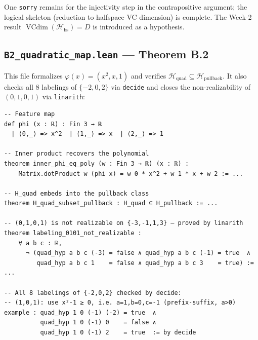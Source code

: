 \documentclass{article}
\begin{document}
One \texttt{sorry} remains for the injectivity step in the contrapositive
argument; the logical skeleton (reduction to halfspace VC dimension) is
complete.  The Week-2 result $\operatorname{VCdim}(\mathcal{H}_{\mathrm{hs}})=D$
is introduced as a hypothesis.
 
\subsection{\texttt{B2\_quadratic\_map.lean} --- Theorem B.2}
 
This file formalizes $\varphi(x)=(x^2,x,1)$ and verifies
$\mathcal{H}_{\mathrm{quad}}\subseteq\mathcal{H}_{\mathrm{pullback}}$.
It also checks all 8 labelings of $\{-2,0,2\}$ via \texttt{decide}
and closes the non-realizability of $(0,1,0,1)$ via \texttt{linarith}:
 
\begin{small}
\begin{verbatim}
-- Feature map
def phi (x : ℝ) : Fin 3 → ℝ
  | ⟨0,_⟩ => x^2  | ⟨1,_⟩ => x  | ⟨2,_⟩ => 1
 
-- Inner product recovers the polynomial
theorem inner_phi_eq_poly (w : Fin 3 → ℝ) (x : ℝ) :
    Matrix.dotProduct w (phi x) = w 0 * x^2 + w 1 * x + w 2 := ...
 
-- H_quad embeds into the pullback class
theorem H_quad_subset_pullback : H_quad ⊆ H_pullback := ...
 
-- (0,1,0,1) is not realizable on {-3,-1,1,3} — proved by linarith
theorem labeling_0101_not_realizable :
    ∀ a b c : ℝ,
      ¬ (quad_hyp a b c (-3) = false ∧ quad_hyp a b c (-1) = true  ∧
         quad_hyp a b c 1    = false ∧ quad_hyp a b c 3    = true) := ...
 
-- All 8 labelings of {-2,0,2} checked by decide:
-- (1,0,1): use x²-1 ≥ 0, i.e. a=1,b=0,c=-1 (prefix-suffix, a>0)
example : quad_hyp 1 0 (-1) (-2) = true  ∧
          quad_hyp 1 0 (-1) 0    = false ∧
          quad_hyp 1 0 (-1) 2    = true  := by decide
\end{verbatim}
\end{small}
 
\end{document}
